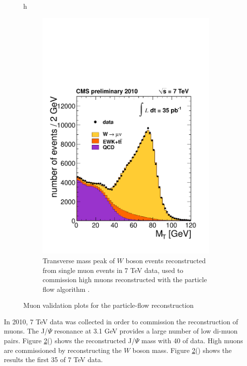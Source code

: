 \begin{figure}{h}
\begin{subfigure}[h]{0.40\textwidth}
        \includegraphics[width=\textwidth]{Figures/Reconstruction_Diagrams/MUO__Wmunu_35pb-1_lin.pdf}
        \caption{Transverse mass peak of $W$ boson events
          reconstructed from single muon events in 7 TeV data, used to
        commission high \PT muons reconstructed with the particle flow
      algorithm \cite{CMS:Muon_particleFlow_commissioning}. }\label{fig:muon_w_mass}
      \end{subfigure}
      \caption{Muon validation plots for the particle-flow reconstruction}\label{fig:muon_pf_validation}
\end{figure}

\par In 2010, 7 TeV data was collected \cite{CMS-PAS-PFT-10-003} in
order to commission the reconstruction of muons.  The J/$\Psi$
resonance at 3.1 GeV provides a large number of low \PT di-muon pairs.
Figure \ref{fig:muon_pf_validation}() shows
the reconstructed J/$\Psi$ mass with 40 \pbinv of data.  High \PT
muons are commissioned by reconstructing the $W$ boson mass.  Figure
\ref{fig:muon_pf_validation}() shows the
results the first 35 \pbinv of 7 TeV data.   


